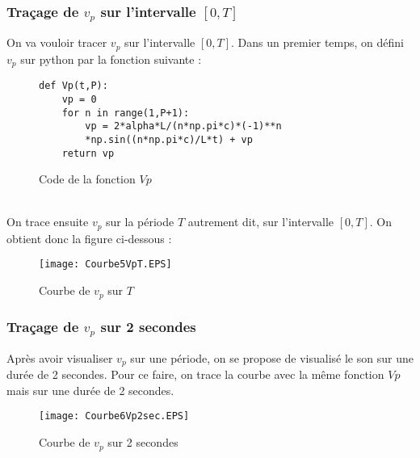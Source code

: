 \documentclass[12pt]{article}
\begin{document}
\subsubsection{Traçage de $v_p$ sur l'intervalle $[0,T]$}
On va vouloir tracer $v_p$ sur l'intervalle $[0,T]$. Dans un premier temps, on défini $v_p$ sur python par la fonction suivante : \\
\begin{figure}[h]
\centering
\begin{minipage}{12cm} %
\begin{lstlisting}[style=stylepython]
def Vp(t,P):
    vp = 0
    for n in range(1,P+1):
        vp = 2*alpha*L/(n*np.pi*c)*(-1)**n
        *np.sin((n*np.pi*c)/L*t) + vp
    return vp

\end{lstlisting}
\end{minipage} %
\caption{Code de la fonction $Vp$}
\end{figure} \\
On trace ensuite $v_p$ sur la période $T$ autrement dit, sur l'intervalle $[0,T]$. On obtient donc la figure ci-dessous : \\
\begin{figure}[h]
\centering
\texttt{[image: Courbe5VpT.EPS]}\\
\caption{Courbe de $v_p$ sur $T$}
\end{figure}
\subsubsection{Traçage de $v_p$ sur 2 secondes}
Après avoir visualiser $v_p$ sur une période, on se propose de visualisé le son sur une durée de 2 secondes. Pour ce faire, on trace la courbe avec la même fonction $Vp$ mais sur une durée de 2 secondes.
\begin{figure}[h]
\centering
\texttt{[image: Courbe6Vp2sec.EPS]}\\
\caption{Courbe de $v_p$ sur 2 secondes}
\end{figure}
\end{document}
